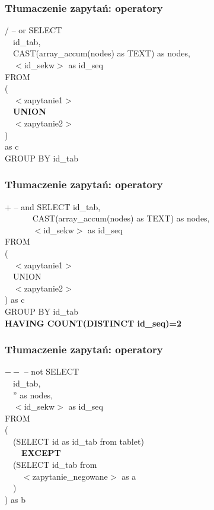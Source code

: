 \begin{frame}
 \frametitle{Tłumaczenie zapytań: operatory}
\begin{block}{/ -- or}
SELECT \\
~~id\_tab, \\
~~CAST(array\_accum(nodes) as TEXT) as nodes, \\
~~$<$id\_sekw$>$ as id\_seq\\
FROM \\
(\\
~~$<$zapytanie1$>$\\
~~\textbf{UNION}\\
~~$<$zapytanie2$>$\\
)\\
as c\\
GROUP BY id\_tab
\end{block}

\end{frame}


\begin{frame}
 \frametitle{Tłumaczenie zapytań: operatory}
\begin{block}{+ -- and}
SELECT id\_tab, \\
~~~~~~ CAST(array\_accum(nodes) as TEXT) as nodes, \\
~~~~~~ $<$id\_sekw$>$ as id\_seq\\
FROM\\
(\\
~~$<$zapytanie1$>$\\
~~UNION\\
~~$<$zapytanie2$>$\\
) as c \\
GROUP BY id\_tab\\
\textbf{HAVING COUNT(DISTINCT id\_seq)=2} \\


\end{block}
\end{frame}

\begin{frame}
 \frametitle{Tłumaczenie zapytań: operatory}
\begin{block}{$--$ -- not}
SELECT \\
~~id\_tab, \\
~~'' as nodes, \\
~~$<$id\_sekw$>$ as id\_seq\\
FROM\\
(\\
~~(SELECT id as id\_tab from tablet)\\
~~~~\textbf{EXCEPT}\\
~~(SELECT id\_tab from\\
~~~~$<$zapytanie\_negowane$>$ as a\\
~~)   \\
) as b
\end{block}

\end{frame}
